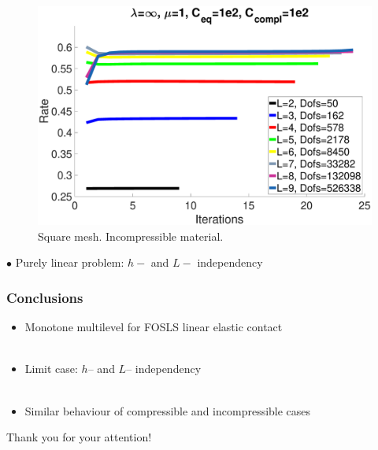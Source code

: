 \documentclass[8pt, oneside]{beamer}   	%
\newcommand{\titlecolor}[1]{\frametitle{\textcolor{dkgrey}{ \textbf{#1}}}}
\begin{document}
\begin{frame}
\begin{figure}[htbp!]
	\quad
		\includegraphics[scale=0.08]{img/SquareRateIncompressible.eps}
	\caption{Square mesh. Incompressible material.}
	\label{ResidualRateSquare}	
	\end{figure}
	$\bullet$ Purely linear problem: $h-$ and $L-$ independency
\end{frame}





\begin{frame}
\titlecolor{Conclusions}
\begin{itemize}
\item Monotone multilevel for FOSLS linear elastic contact 
${}$\\${}$\\
\item Limit case: $h$-- and $L$-- independency
${}$\\${}$\\
\item Similar behaviour of compressible and incompressible cases
\end{itemize}
\end{frame}



\begin{frame}
\centering
\huge
Thank you for your attention!
\end{frame}

\appendix
\end{document}
